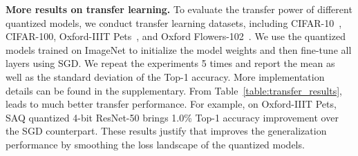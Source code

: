 \noindent\textbf{More results on transfer learning.}
To evaluate the transfer power of different quantized models, we conduct transfer learning  datasets, including CIFAR-10~\cite{krizhevsky2009learning}, CIFAR-100, Oxford-IIIT Pets~\cite{parkhi2012cats}, and Oxford Flowers-102~\cite{nilsback2008automated}. We use the quantized models trained on ImageNet to initialize the model weights and then fine-tune all layers using SGD. We repeat the experiments 5 times and report the mean as well as the standard deviation of the Top-1 accuracy. More implementation details can be found in the supplementary. From Table~\ref{table:transfer_results}, \methodshortname leads to much better transfer performance. For example, on Oxford-IIIT Pets, SAQ quantized 4-bit ResNet-50 brings 1.0\% Top-1 accuracy improvement over the SGD counterpart. These results justify that \methodshortname improves the generalization performance by smoothing the loss landscape of the quantized models.